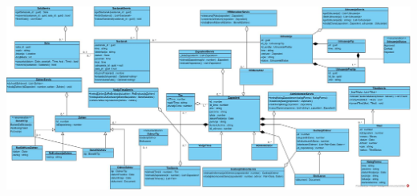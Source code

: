 \documentclass{article}
\begin{document}
\begin{center}
  \includegraphics[scale=0.3, angle=90]{EvidencijaZaposlenihKlasniDijagram.jpg}
\end{center}
\end{document}
